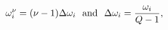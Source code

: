 \documentclass[preview]{standalone}
\begin{document}
\begin{varwidth}{50in}
  \begin{equation}
    \omega_i^{\nu} = 
    (\nu - 1) \Delta \omega_i
    {\rm ~~and~~} \Delta \omega_i = \frac{\omega_i}{Q-1}
  , \nonumber
  \end{equation}
\end{varwidth}
\end{document}
